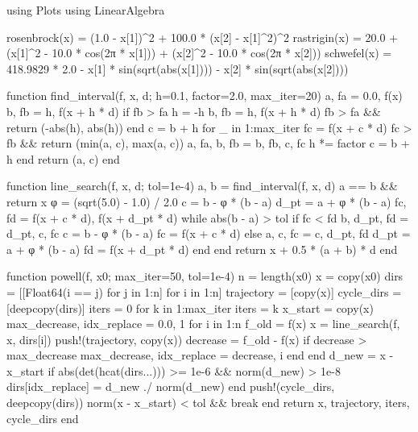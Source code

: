 \documentclass[a4paper, 14pt]{extarticle}
\begin{document}
\begin{breakablelisting}
using Plots
using LinearAlgebra

rosenbrock(x) = (1.0 - x[1])^2 + 100.0 * (x[2] - x[1]^2)^2
rastrigin(x) = 20.0 + (x[1]^2 - 10.0 * cos(2π * x[1])) + (x[2]^2 - 10.0 * cos(2π * x[2]))
schwefel(x) = 418.9829 * 2.0 - x[1] * sin(sqrt(abs(x[1]))) - x[2] * sin(sqrt(abs(x[2])))

function find_interval(f, x, d; h=0.1, factor=2.0, max_iter=20)
    a, fa = 0.0, f(x)
    b, fb = h, f(x + h * d)
    if fb > fa
        h = -h
        b, fb = h, f(x + h * d)
        fb > fa && return (-abs(h), abs(h))
    end
    c = b + h
    for _ in 1:max_iter
        fc = f(x + c * d)
        fc > fb && return (min(a, c), max(a, c))
        a, fa, b, fb = b, fb, c, fc
        h *= factor
        c = b + h
    end
    return (a, c)
end

function line_search(f, x, d; tol=1e-4)
    a, b = find_interval(f, x, d)
    a == b && return x
    φ = (sqrt(5.0) - 1.0) / 2.0
    c = b - φ * (b - a)
    d_pt = a + φ * (b - a)
    fc, fd = f(x + c * d), f(x + d_pt * d)
    while abs(b - a) > tol
        if fc < fd
            b, d_pt, fd = d_pt, c, fc
            c = b - φ * (b - a)
            fc = f(x + c * d)
        else
            a, c, fc = c, d_pt, fd
            d_pt = a + φ * (b - a)
            fd = f(x + d_pt * d)
        end
    end
    return x + 0.5 * (a + b) * d
end

function powell(f, x0; max_iter=50, tol=1e-4)
    n = length(x0)
    x = copy(x0)
    dirs = [[Float64(i == j) for j in 1:n] for i in 1:n]
    trajectory = [copy(x)]
    cycle_dirs = [deepcopy(dirs)]
    iters = 0
    for k in 1:max_iter
        iters = k
        x_start = copy(x)
        max_decrease, idx_replace = 0.0, 1
        for i in 1:n
            f_old = f(x)
            x = line_search(f, x, dirs[i])
            push!(trajectory, copy(x))
            decrease = f_old - f(x)
            if decrease > max_decrease
                max_decrease, idx_replace = decrease, i
            end
        end
        d_new = x - x_start
        if abs(det(hcat(dirs...))) >= 1e-6 && norm(d_new) > 1e-8
            dirs[idx_replace] = d_new ./ norm(d_new)
        end
        push!(cycle_dirs, deepcopy(dirs))
        norm(x - x_start) < tol && break
    end
    return x, trajectory, iters, cycle_dirs
end


\end{breakablelisting}
\end{document}
